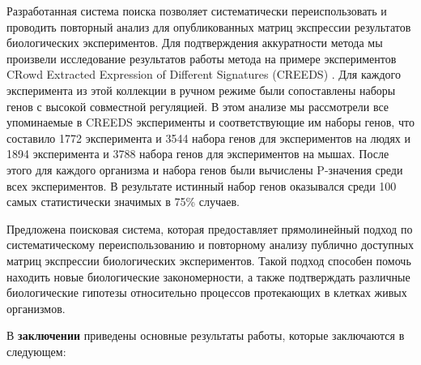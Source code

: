 Разработанная система поиска позволяет систематически переиспользовать и проводить повторный анализ для опубликованных матриц экспрессии результатов биологических экспериментов.
Для подтверждения аккуратности метода мы произвели исследование результатов работы метода на примере экспериментов CRowd Extracted Expression of Different Signatures (CREEDS) \cite{wang2016extraction}.
Для каждого эксперимента из этой коллекции в ручном режиме были сопоставлены наборы генов с высокой совместной регуляцией.
В этом анализе мы рассмотрели все упоминаемые в CREEDS эксперименты и соответствующие им наборы генов, что составило 1772 эксперимента и 3544 набора генов для экспериментов на людях и 1894 эксперимента и 3788 набора генов для экспериментов на мышах.
После этого для каждого организма и набора генов были вычислены P-значения среди всех экспериментов.
В результате истинный набор генов оказывался среди 100 самых статистически значимых в 75\% случаев.

Предложена поисковая система, которая предоставляет прямолинейный подход по систематическому переиспользованию и повторному анализу публично доступных матриц экспрессии биологических экспериментов.
Такой подход способен помочь находить новые биологические закономерности, а также подтверждать различные биологические гипотезы относительно процессов протекающих в клетках живых организмов.


\FloatBarrier
{}                                  %
В \textbf{заключении} приведены основные результаты работы, которые заключаются в следующем:



